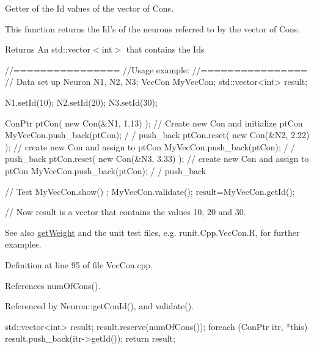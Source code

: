 Getter of the Id values of the vector of Cons. 

This function returns the Id's of the neurons referred to by the vector of Cons. \begin{DoxyReturn}{Returns}
An std::vector$<$int$>$ that contains the Ids
\end{DoxyReturn}

\begin{DoxyCode}
  //================
  //Usage example:
  //================
        // Data set up
                        Neuron N1, N2, N3;
                        VecCon MyVecCon;
                        std::vector<int> result;

                        N1.setId(10);
                        N2.setId(20);
                        N3.setId(30);

                        ConPtr ptCon( new Con(&N1, 1.13) );     // Create new Con
       and initialize ptCon
                        MyVecCon.push_back(ptCon);                              /
      / push_back
                        ptCon.reset(  new Con(&N2, 2.22) );             // create
       new Con and assign to ptCon
                        MyVecCon.push_back(ptCon);                              /
      / push_back
                        ptCon.reset(  new Con(&N3, 3.33) );             // create
       new Con and assign to ptCon
                        MyVecCon.push_back(ptCon);                              /
      / push_back

        // Test
                        MyVecCon.show() ;
                        MyVecCon.validate();
                        result=MyVecCon.getId();

        // Now result is a vector that contains the values 10, 20 and 30.
\end{DoxyCode}


\begin{DoxySeeAlso}{See also}
\hyperlink{class_vec_con_aafa37c30d566b8784ac84d23a14b5638}{getWeight} and the unit test files, e.g. runit.Cpp.VecCon.R, for further examples. 
\end{DoxySeeAlso}


Definition at line 95 of file VecCon.cpp.



References numOfCons().



Referenced by Neuron::getConId(), and validate().


\begin{DoxyCode}
{
  std::vector<int> result;
  result.reserve(numOfCons());
  foreach (ConPtr itr, *this)
    {
      result.push_back(itr->getId());
    }
  return result;
}
\end{DoxyCode}


